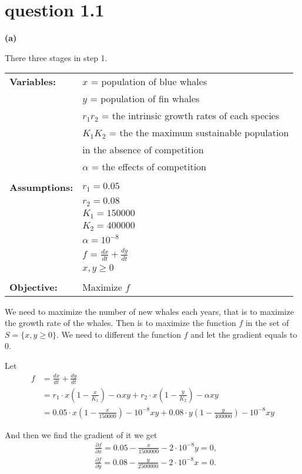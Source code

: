 \documentclass{report}
\begin{document}
\section*{question 1.1}
{\bf (a)}\par
\vspace{1.em}

\hspace{-1.5em}{\bf Step 1. Ask the question}\par 
There three stages in step 1.  

\vspace{0.5em}
\begin{tabular}{ll} 
{\bf Variables:} &$x$ = population of blue whales\\
&$y$ = population of fin whales\\
&$r_1 r_2$ = the intrinsic growth rates of each species\\
&$K_1 K_2$ = the the maximum sustainable population \\
&in the absence of competition\\
&$\alpha $ = the effects of competition\\
&\\
{\bf Assumptions:} &$r_1 = 0.05$\\
&$r_2 = 0.08$\\
&$K_1 = 150000$\\
&$K_2 = 400000$\\
&$\alpha  = 10^{-8}$\\
&$f$ = $\frac{dx}{dt} + \frac{dy}{dt}$\\
&$x, y\geq0$\\
&\\
{\bf Objective:} &Maximize $f$
\end{tabular}

\vspace{1em}
\hspace{-1.5em}{\bf Step 2. Select the modeling approach}\par
We need to maximize the number of new whales each years, that is 
to maximize the growth rate of the whales. Then is to maximize 
the function $f$ in the set of $S = \{x, y\geq0\}$. We need to 
different the function $f$ and let the gradient equals to 0.

\vspace{1em}
\hspace{-1.5em}{\bf Step 3. Formulate the model}\par
Let
\begin{align*}
    f&=\frac{dx}{dt} + \frac{dy}{dt}\\
    &={r_1}\cdot x(1-\frac{x}{K_1})-\alpha xy + {r_2}\cdot x(1-\frac{y}{K_2})-\alpha xy\\
    &=0.05\cdot x(1-\frac{x}{150000})-10^{-8} xy + 0.08\cdot y(1-\frac{y}{400000})-10^{-8} xy
\end{align*}
\par And then we find the gradient of it we get
\begin{align*}
    &\frac{\partial f}{\partial x}=0.05-\frac{x}{1500000}-2\cdot 10^{-8}y=0,\\
    &\frac{\partial f}{\partial y}=0.08-\frac{y}{2500000}-2\cdot 10^{-8}x=0.
\end{align*}
\end{document}
